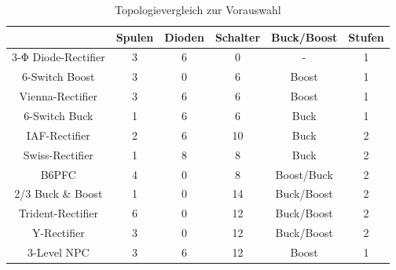 \begin{table}
	\caption{Topologievergleich zur Vorauswahl}
	\label{tab:vorauswahl}
\begin{tabular}{c|c|c|c|c|c} %
	& Spulen & Dioden & Schalter & Buck/Boost & Stufen \\
	\hline
	3-Φ Diode-Rectifier &\cellcolor{yellow!25}3 &\cellcolor{red!25}6 &\cellcolor{green!25}0 & \cellcolor{red!25}- & \cellcolor{green!25}1 \\
	\hline
	6-Switch Boost& \cellcolor{yellow!25}3 &\cellcolor{green!25}0 & \cellcolor{green!25}6 & \cellcolor{red!25}Boost & \cellcolor{green!25}1 \\
	\hline
	Vienna-Rectifier & \cellcolor{yellow!25}3 &\cellcolor{red!25}6 & \cellcolor{green!25}6 & \cellcolor{red!25}Boost & \cellcolor{green!25}1 \\
	\hline
	\cellcolor{green!10}6-Switch Buck & \cellcolor{green!25}1 &\cellcolor{red!25}6 &\cellcolor{green!25}6 & \cellcolor{green!25}Buck & \cellcolor{green!25}1 \\
	\hline
	\cellcolor{green!10} \gls{IAF}-Rectifier & \cellcolor{green!25}2 &\cellcolor{red!25}6 & \cellcolor{yellow!25}10 & \cellcolor{green!25}Buck & \cellcolor{red!25}2 \\
	\hline
	\cellcolor{green!10}Swiss-Rectifier & \cellcolor{green!25}1 &\cellcolor{red!25}8 &\cellcolor{green!25}8 & \cellcolor{green!25} Buck & \cellcolor{red!25}2 \\
	\hline
	\cellcolor{green!10} \gls{B6PFC} &\cellcolor{yellow!25}4 & \cellcolor{green!25}0 &\cellcolor{green!25}8 &\cellcolor{green!25} Boost/Buck & \cellcolor{red!25}2 \\
	\hline
	2/3 Buck \& Boost  & \cellcolor{green!25}1 & \cellcolor{green!25}0 & \cellcolor{yellow!25}14 & \cellcolor{green!25}Buck/Boost & \cellcolor{red!25}2 \\
	\hline
	Trident-Rectifier  & \cellcolor{red!25}6 &\cellcolor{green!25}0 & \cellcolor{yellow!25}12 & \cellcolor{green!25}Buck/Boost & \cellcolor{red!25}2 \\
	\hline
	Y-Rectifier & \cellcolor{yellow!25}3 &\cellcolor{green!25}0 & \cellcolor{yellow!25}12 &\cellcolor{green!25} Buck/Boost & \cellcolor{red!25}2 \\
	\hline
	3-Level NPC & \cellcolor{yellow!25}3 &\cellcolor{red!25}6 & \cellcolor{yellow!25}12 & \cellcolor{red!25}Boost & \cellcolor{green!25}1 \\

\end{tabular}
\end{table}
